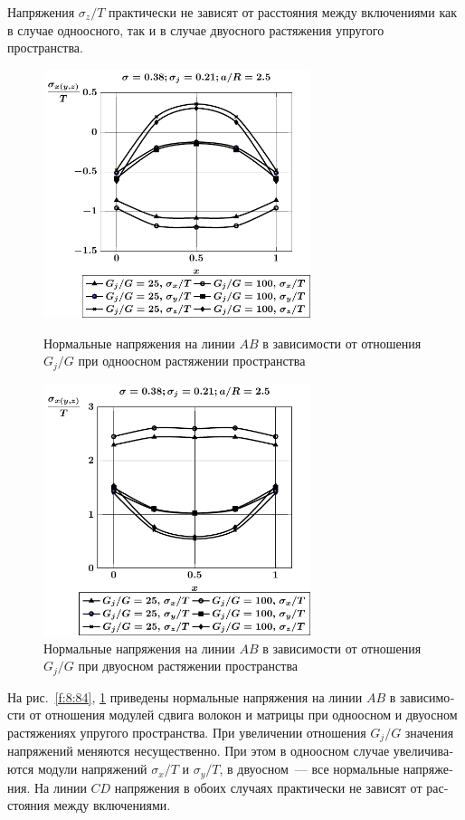 \begin{russian}
Напряжения $\sigma_z/T$ практически не зависят от расстояния между включениями как в случае одноосного, так и в случае двуосного растяжения упругого пространства.

\begin{figure}[h!]
\centering\footnotesize
\parbox[b]{7.5cm}{\centering\includegraphics[width=7.8cm]{inc13-g-a25-d95-t1-ab.pdf}
\caption{Нормальные напряжения на линии  $AB$ в зависимости от отношения $G_j/G$ при одноосном растяжении пространства
\label{f:8:84}}}\hfil\hfil
\parbox[b]{7.5cm}{\centering\includegraphics[width=7.8cm]{inc13-g-a25-d95-t2-ab.pdf}
\caption{Нормальные напряжения на линии  $AB$ в зависимости от отношения $G_j/G$ при двуосном растяжении пространства
\label{f:8:85}}}
\end{figure}

На рис.~\ref{f:8:84}, \ref{f:8:85} приведены нормальные напряжения на линии $AB$ в зависимости от отношения модулей сдвига волокон и матрицы при одноосном и двуосном растяжениях упругого пространства. При увеличении отношения $G_j/G$ значения напряжений меняются несущественно. При этом в одноосном случае увеличиваются модули напряжений $\sigma_x/T$ и $\sigma_y/T$, в двуосном~--- все нормальные напряжения. На линии $CD$ напряжения в обоих случаях практически не зависят от расстояния между включениями.


\end{russian}
